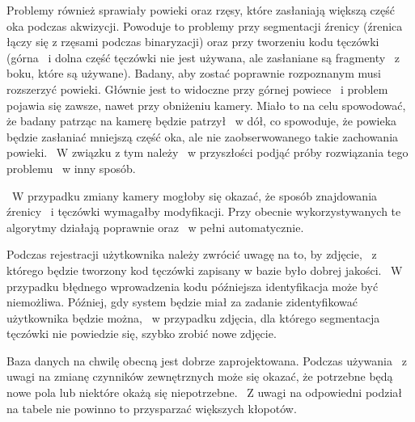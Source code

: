 Problemy również sprawiały powieki oraz rzęsy, które zasłaniają większą część oka podczas akwizycji. Powoduje to problemy przy segmentacji źrenicy (źrenica łączy się z rzęsami podczas binaryzacji) oraz przy tworzeniu kodu tęczówki (górna ~i dolna część tęczówki nie jest używana, ale zasłaniane są fragmenty ~z boku, które są używane). Badany, aby zostać poprawnie rozpoznanym musi rozszerzyć powieki. Głównie jest to widoczne przy górnej powiece ~i problem pojawia się zawsze, nawet przy obniżeniu kamery. Miało to na celu spowodować, że badany patrząc na kamerę będzie patrzył ~w dół, co spowoduje, że powieka będzie zasłaniać mniejszą część oka, ale nie zaobserwowanego takie zachowania powieki. ~W związku z tym należy ~w przyszłości podjąć próby rozwiązania tego problemu ~w inny sposób.

~W przypadku zmiany kamery mogłoby się okazać, że sposób znajdowania źrenicy ~i tęczówki wymagałby modyfikacji. Przy obecnie wykorzystywanych te algorytmy działają poprawnie oraz ~w pełni automatycznie.

Podczas rejestracji użytkownika należy zwrócić uwagę na to, by zdjęcie, ~z którego będzie tworzony kod tęczówki zapisany w bazie było dobrej jakości. ~W przypadku błędnego wprowadzenia kodu późniejsza identyfikacja może być niemożliwa. Później, gdy system będzie miał za zadanie zidentyfikować użytkownika będzie można, ~w przypadku zdjęcia, dla którego segmentacja tęczówki nie powiedzie się, szybko zrobić nowe zdjęcie.

Baza danych na chwilę obecną jest dobrze zaprojektowana. Podczas używania ~z uwagi na zmianę czynników zewnętrznych może się okazać, że potrzebne będą nowe pola lub niektóre okażą się niepotrzebne. ~Z uwagi na odpowiedni podział na tabele nie powinno to przysparzać większych kłopotów.

